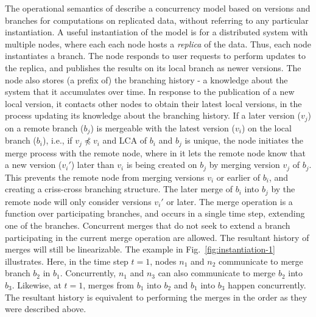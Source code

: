 The operational semantics of \name describe a concurrency model based
on versions and branches for computations on replicated data, without
referring to any particular instantiation. A useful instantiation of
the model is for a distributed system with multiple nodes, where each
each node hosts a \emph{replica} of the data. Thus, each node
instantiates a branch. The node responds to user requests to perform
updates to the replica, and publishes the results on its local branch
as newer versions. The node also stores (a prefix of) the branching
history - a knowledge about the system that it accumulates over time.
In response to the publication of a new local version, it contacts
other nodes to obtain their latest local versions, in the process
updating its knowledge about the branching history. If a later version
($v_j$) on a remote branch ($b_j$) is mergeable with the latest
version ($v_i$) on the local branch ($b_i$), i.e., if $v_j \not\preceq
v_i$ and LCA of $b_i$ and $b_j$ is unique, the node initiates the
merge process with the remote node, where in it lets the remote node
know that a new version ($v_i'$) later than $v_i$ is being created on
$b_j$ by merging version $v_j$ of $b_j$. This prevents the remote node
from merging versions $v_i$ or earlier of $b_i$, and creating a
criss-cross branching structure. The later merge of $b_i$ into $b_j$
by the remote node will only consider versions $v_i'$ or later. The
merge operation is a function over participating branches, and occurs
in a single time step, extending one of the branches. Concurrent
merges that do not seek to extend a branch participating in the
current merge operation are allowed. The resultant history of merges
will still be linearizable. The example in
Fig.~\ref{fig:instantiation-1} illustrates. Here, in the time step
$t=1$, nodes $n_1$ and $n_2$ communicate to merge branch $b_2$ in
$b_1$. Concurrently, $n_1$ and $n_3$ can also communicate to merge
$b_2$ into $b_3$. Likewise, at $t=1$, merges from $b_1$ into $b_2$ and
$b_1$ into $b_3$ happen concurrently. The resultant history is
equivalent to performing the merges in the order as they were
described above.

